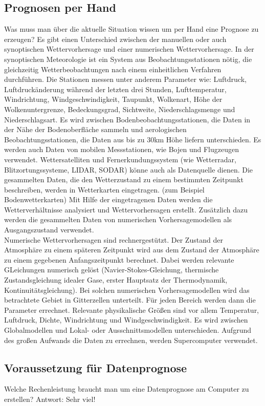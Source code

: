 \documentclass[a4paper,oneside,10pt,titlepage]{article}
\begin{document}
\subsection{Prognosen per Hand}
Was muss man über die aktuelle Situation wissen um per Hand eine Prognose zu erzeugen?
Es gibt einen Unterschied zwischen der manuellen oder auch synoptischen Wettervorhersage und einer numerischen Wettervorhersage. In der synoptischen Meteorologie ist ein System aus Beobachtungsstationen nötig, die gleichzeitig Wetterbeobachtungen nach einem einheitlichen Verfahren durchführen. Die Stationen messen unter anderem Parameter wie: Luftdruck, Luftdruckänderung während der letzten drei Stunden, Lufttemperatur, Windrichtung, Windgeschwindigkeit, Taupunkt, Wolkenart, Höhe der Wolkenuntergrenze, Bedeckungsgrad, Sichtweite, Niederschlagsmenge und Niederschlagsart. Es wird zwischen Bodenbeobachtungsstationen, die Daten in der Nähe der Bodenoberfläche sammeln und aerologischen Beobachtungsstationen, die Daten aus bis zu 30km Höhe liefern unterschieden. Es werden auch Daten von mobilen Messstationen, wie Bojen und Flugzeugen verwendet. Wettersatelliten und Fernerkundungssystem (wie Wetterradar, Blitzortungssysteme, LIDAR, SODAR) könne auch als Datenquelle dienen. Die gesammelten Daten, die den Wetterzustand zu einem bestimmten Zeitpunkt beschreiben, werden in Wetterkarten eingetragen. (zum Beispiel Bodenwetterkarten) Mit Hilfe der eingetragenen Daten werden die Wetterverhältnisse analysiert und Wettervorhersagen erstellt. Zusätzlich dazu werden die gesammelten Daten von numerischen Vorhersagemodellen als Ausgangszustand verwendet. %
\\
Numerische Wettervorhersagen sind rechnergestützt. Der Zustand der Atmosphäre zu einem späteren Zeitpunkt wird aus dem Zustand der Atmosphäre zu einem gegebenen Anfangszeitpunkt berechnet. Dabei werden relevante GLeichungen numerisch gelöst (Navier-Stokes-Gleichung, thermische Zustandsgleichung idealer Gase, erster Hauptsatz der Thermodynamik, Kontinuitätsgleichung). Bei solchen numerischen Vorhersagemodellen wird das betrachtete Gebiet in Gitterzellen unterteilt. Für jeden Bereich werden dann die Parameter errechnet. Relevante physikalische Größen sind vor allem Temperatur, Luftdruck, Dichte, Windrichtung und Windgeschwindigkeit. Es wird zwischen Globalmodellen und Lokal- oder Ausschnittsmodellen unterschieden. Aufgrund des großen Aufwands die Daten zu errechnen, werden Supercomputer verwendet.
\subsection{Voraussetzung für Datenprognose}
Welche Rechenleistung braucht man um eine Datenprognose am Computer zu erstellen? Antwort: Sehr viel!
\end{document}

